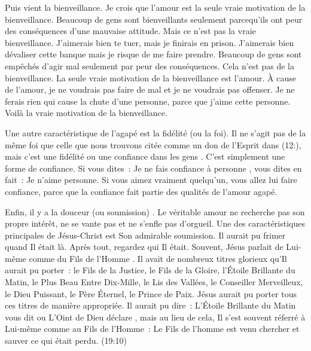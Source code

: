 Puis vient la bienveillance. Je crois que l'amour est la seule
 vraie motivation de la bienveillance.
 Beaucoup de gens sont bienveillants seulement parcequ'ils ont peur
 des conséquences d'une mauvaise attitude.
 Mais ce n'est pas la vraie bienveillance.
 \og J'aimerais bien te tuer, mais je finirais en prison. \fg{}
 \og J'aimerais bien dévaliser cette banque mais je risque
 de me faire prendre. \fg{}
 Beaucoup de gens sont empêchés d'agir mal seulement par peur
 des conséquences. Cela n'est pas de la bienveillance.
 La seule vraie motivation de la bienveillance est l'amour.
 À cause de l'amour, je ne voudrais pas faire de mal
 et je ne voudrais pas offenser. Je ne ferais rien qui cause
 la chute d'une personne, parce que j'aime cette personne.
 Voilà la vraie motivation de la bienveillance.

\begin{specialpar}{}
Une autre caractéristique de l'agapé est la fidélité (ou la foi).
 Il ne s'agit pas de la même foi que celle que nous trouvons citée
 comme un don de l'Esprit dans (12:),
 mais c'est une fidélité ou une confiance dans les gens
 .
 C'est simplement une forme de confiance. Si vous dites~:
 \og Je ne fais confiance à personne \fg{}, vous dites en fait~:
 \og Je n'aime personne. \fg{}
 Si vous aimez vraiment quelqu'un, vous allez lui faire confiance,
 parce que la confiance fait partie des qualités de l'amour agapé.
\end{specialpar}

Enfin, il y a la douceur (ou soumission)
 .
 Le véritable amour ne recherche pas son propre intérêt,
 ne se vante pas et ne s'enfle pas d'orgueil.
 Une des caractéristiques principales de Jésus-Christ
 est Son admirable soumission. Il aurait pu frimer quand Il était là.
 Après tout, regardez qui Il était. Souvent, Jésus parlait de Lui-même
 comme du \og Fils de l'Homme \fg{}.
 Il avait de nombreux titres glorieux qu'Il aurait pu porter~:
 le Fils de la Justice, le Fils de la Gloire, l'Étoile Brillante du Matin,
 le Plus Beau Entre Dix-Mille, le Lis des Vallées,
 le Conseiller Merveilleux, le Dieu Puissant, le Père Éternel,
 le Prince de Paix. Jésus aurait pu porter tous ces titres
 de manière appropriée. Il aurait pu dire~:
 \og L'Étoile Brillante du Matin vous dit \fg{} ou
 \og L'Oint de Dieu déclare \fg{}, mais au lieu de cela,
 Il s'est souvent réferré à Lui-même comme au Fils de l'Homme~:
 \og Le Fils de l'homme est venu chercher et sauver
 ce qui était perdu. \fg{} (19:10)

